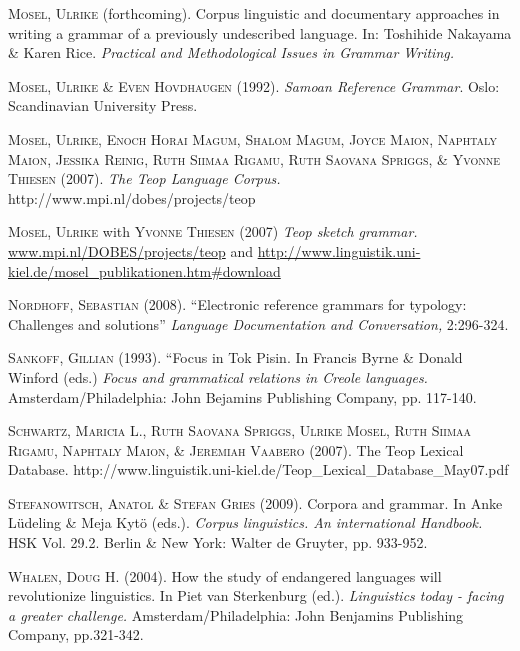 \documentclass[letterpaper]{article}
\newcommand\textstyleapplestylespan[1]{#1}
\begin{document}
{\upshape
\textsc{Mosel, Ulrike} (forthcoming). Corpus linguistic and documentary approaches in writing a grammar of a previously undescribed language. In: Toshihide Nakayama \& Karen Rice. \textstyleapplestylespan{\textit{Practical and Methodological Issues in Grammar Writing.}}}

{\upshape
\textsc{Mosel, Ulrike \& Even Hovdhaugen} (1992). \textit{Samoan Reference Grammar}. Oslo: Scandinavian University Press.}

{\upshape
\textsc{Mosel, Ulrike, Enoch Horai Magum, Shalom Magum, Joyce Maion, Naphtaly Maion, Jessika Reinig, Ruth Siimaa Rigamu, Ruth Saovana Spriggs, \& Yvonne Thiesen} (2007). \textit{The Teop Language Corpus.} http://www.mpi.nl/dobes/projects/teop }

{\upshape
\textsc{Mosel, Ulrike} with \textsc{Yvonne Thiesen} (2007) \textit{Teop sketch grammar.} \href{http://www.mpi.nl/DOBES/projects/teop}{www.mpi.nl/DOBES/projects/teop} and \hyperlink{download}{http://www.linguistik.uni-kiel.de/mosel\_publikationen.htm\#download} }

{\upshape
\textsc{Nordhoff, Sebastian }(2008). {\textquotedblleft}Electronic reference grammars for typology: Challenges and solutions{\textquotedblright} \textit{Language Documentation and Conversation, }2:296-324.}

{\upshape
\textsc{Sankoff, Gillian (1993). {\textquotedblleft}}Focus in Tok Pisin. In Francis Byrne \& Donald Winford (eds.) \textit{Focus and grammatical relations in Creole languages.} Amsterdam/Philadelphia: John Bejamins Publishing Company, pp. 117-140.}

{\upshape
\textsc{Schwartz, Maricia L., Ruth Saovana Spriggs, Ulrike Mosel, Ruth Siimaa Rigamu, Naphtaly Maion, \& Jeremiah Vaabero }(2007). The Teop Lexical Database. \textsc{ } http://www.linguistik.uni-kiel.de/Teop\_Lexical\_Database\_May07.pdf}

{\upshape
\textsc{Stefanowitsch, Anatol \& Stefan Gries} (2009). Corpora and grammar. In Anke L\"udeling \& Meja Kyt\"o (eds.). \textit{Corpus linguistics. An international Handbook. }HSK Vol. 29.2. Berlin \& New York: Walter de Gruyter, pp. 933-952.}

{\upshape
\textsc{Whalen, Doug H. (2004). }How the study of endangered languages will revolutionize linguistics. In Piet van Sterkenburg (ed.). \textit{Linguistics today - facing a greater challenge. }Amsterdam/Philadelphia: John Benjamins Publishing Company, pp.321-342.}
\end{document}
